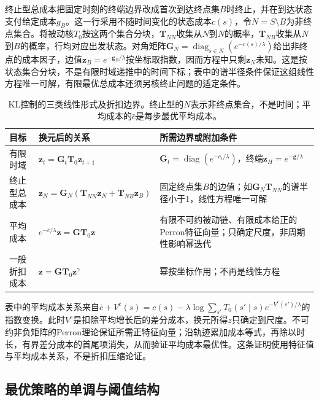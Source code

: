 终止型总成本把固定时刻的终端边界改成首次到达终点集$B$时终止，并在到达状态支付给定成本$g_B$。这一行采用不随时间变化的状态成本$c(s)$，令$N=S\setminus B$为非终点集合。将被动核$T_0$按这两个集合分块，$\bm T_{NN}$收集从$N$到$N$的概率，$\bm T_{NB}$收集从$N$到$B$的概率，行均对应出发状态。对角矩阵$\bm G_N=\operatorname{diag}_{s\in N}(e^{-c(s)/\lambda})$给出非终点的成本因子，边值$\bm z_B=e^{-\bm g_B/\lambda}$按坐标取指数，因而方程中只剩$\bm z_N$未知。这是按状态集合分块，不是有限时域递推中的时间下标；表中的谱半径条件保证这组线性方程唯一可解，有限最优总成本还须另核终止问题的适定条件。

\begin{table}[htbp]
 \centering
 \small
 \begin{tabularx}{\linewidth}{@{}l>{\raggedright\arraybackslash}X>{\raggedright\arraybackslash}X@{}}
  \toprule
  目标 & 换元后的关系 & 所需边界或附加条件\\
  \midrule
  有限时域 & $\bm z_t=\bm G_t\bm T_0\bm z_{t+1}$ & $\bm G_t=\operatorname{diag}(e^{-c_t/\lambda})$，终端$\bm z_H=e^{-\bm g/\lambda}$\\
  终止型总成本 & $\bm z_N=\bm G_N(\bm T_{NN}\bm z_N+\bm T_{NB}\bm z_B)$ & 固定终点集$B$的边值；如$\bm G_N\bm T_{NN}$的谱半径小于1，线性方程唯一可解\\
  平均成本 & $e^{-\bar c/\lambda}\bm z=\bm G\bm T_0\bm z$ & 有限不可约被动链、有限成本给正的Perron特征向量；只确定尺度，非周期性影响幂迭代\\
  一般折扣成本 & $\bm z=\bm G\bm T_0\bm z^\gamma$ & 幂按坐标作用；不再是线性方程\\
  \bottomrule
 \end{tabularx}
 \caption{KL控制的三类线性形式及折扣边界。终止型的$N$表示非终点集合，不是时间；平均成本的$\bar c$是每步最优平均成本。}
 \label{tab:rl-planning-kl-regimes}
\end{table}

表中的平均成本关系来自$\bar c+V^{\mathrm c}(s)=c(s)-\lambda\log\sum_{s'}T_0(s'\mid s)e^{-V^{\mathrm c}(s')/\lambda}$的指数变换。此时$V^{\mathrm c}$是扣除平均增长后的差分成本，换元所得$z$只确定到尺度。不可约非负矩阵的Perron理论保证所需正特征向量；沿轨迹累加成本等式，再除以时长，有界差分成本的首尾项消失，从而验证平均成本最优性。这条证明使用特征值与平均成本关系，不是折扣压缩论证。

\subsection{最优策略的单调与阈值结构}
\label{sec:rl-planning-monotone}

